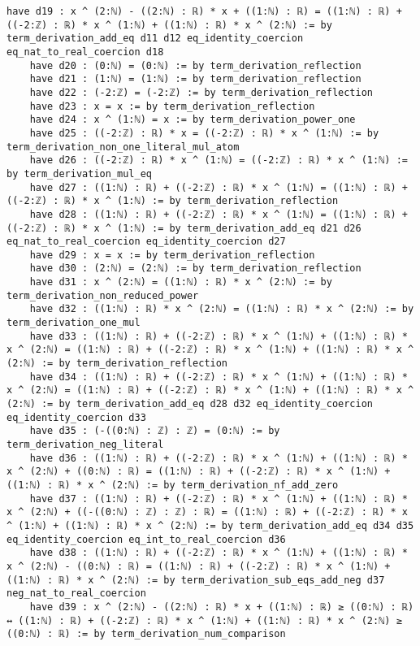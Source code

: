 \documentclass{article}
\begin{document}
\begin{tcolorbox}[colback=white!10, width=\linewidth]
\begin{lstlisting}[language=Lean4]
    have d19 : x ^ (2:ℕ) - ((2:ℕ) : ℝ) * x + ((1:ℕ) : ℝ) = ((1:ℕ) : ℝ) + ((-2:ℤ) : ℝ) * x ^ (1:ℕ) + ((1:ℕ) : ℝ) * x ^ (2:ℕ) := by term_derivation_add_eq d11 d12 eq_identity_coercion eq_nat_to_real_coercion d18
    have d20 : (0:ℕ) = (0:ℕ) := by term_derivation_reflection
    have d21 : (1:ℕ) = (1:ℕ) := by term_derivation_reflection
    have d22 : (-2:ℤ) = (-2:ℤ) := by term_derivation_reflection
    have d23 : x = x := by term_derivation_reflection
    have d24 : x ^ (1:ℕ) = x := by term_derivation_power_one
    have d25 : ((-2:ℤ) : ℝ) * x = ((-2:ℤ) : ℝ) * x ^ (1:ℕ) := by term_derivation_non_one_literal_mul_atom
    have d26 : ((-2:ℤ) : ℝ) * x ^ (1:ℕ) = ((-2:ℤ) : ℝ) * x ^ (1:ℕ) := by term_derivation_mul_eq
    have d27 : ((1:ℕ) : ℝ) + ((-2:ℤ) : ℝ) * x ^ (1:ℕ) = ((1:ℕ) : ℝ) + ((-2:ℤ) : ℝ) * x ^ (1:ℕ) := by term_derivation_reflection
    have d28 : ((1:ℕ) : ℝ) + ((-2:ℤ) : ℝ) * x ^ (1:ℕ) = ((1:ℕ) : ℝ) + ((-2:ℤ) : ℝ) * x ^ (1:ℕ) := by term_derivation_add_eq d21 d26 eq_nat_to_real_coercion eq_identity_coercion d27
    have d29 : x = x := by term_derivation_reflection
    have d30 : (2:ℕ) = (2:ℕ) := by term_derivation_reflection
    have d31 : x ^ (2:ℕ) = ((1:ℕ) : ℝ) * x ^ (2:ℕ) := by term_derivation_non_reduced_power
    have d32 : ((1:ℕ) : ℝ) * x ^ (2:ℕ) = ((1:ℕ) : ℝ) * x ^ (2:ℕ) := by term_derivation_one_mul
    have d33 : ((1:ℕ) : ℝ) + ((-2:ℤ) : ℝ) * x ^ (1:ℕ) + ((1:ℕ) : ℝ) * x ^ (2:ℕ) = ((1:ℕ) : ℝ) + ((-2:ℤ) : ℝ) * x ^ (1:ℕ) + ((1:ℕ) : ℝ) * x ^ (2:ℕ) := by term_derivation_reflection
    have d34 : ((1:ℕ) : ℝ) + ((-2:ℤ) : ℝ) * x ^ (1:ℕ) + ((1:ℕ) : ℝ) * x ^ (2:ℕ) = ((1:ℕ) : ℝ) + ((-2:ℤ) : ℝ) * x ^ (1:ℕ) + ((1:ℕ) : ℝ) * x ^ (2:ℕ) := by term_derivation_add_eq d28 d32 eq_identity_coercion eq_identity_coercion d33
    have d35 : (-((0:ℕ) : ℤ) : ℤ) = (0:ℕ) := by term_derivation_neg_literal
    have d36 : ((1:ℕ) : ℝ) + ((-2:ℤ) : ℝ) * x ^ (1:ℕ) + ((1:ℕ) : ℝ) * x ^ (2:ℕ) + ((0:ℕ) : ℝ) = ((1:ℕ) : ℝ) + ((-2:ℤ) : ℝ) * x ^ (1:ℕ) + ((1:ℕ) : ℝ) * x ^ (2:ℕ) := by term_derivation_nf_add_zero
    have d37 : ((1:ℕ) : ℝ) + ((-2:ℤ) : ℝ) * x ^ (1:ℕ) + ((1:ℕ) : ℝ) * x ^ (2:ℕ) + ((-((0:ℕ) : ℤ) : ℤ) : ℝ) = ((1:ℕ) : ℝ) + ((-2:ℤ) : ℝ) * x ^ (1:ℕ) + ((1:ℕ) : ℝ) * x ^ (2:ℕ) := by term_derivation_add_eq d34 d35 eq_identity_coercion eq_int_to_real_coercion d36
    have d38 : ((1:ℕ) : ℝ) + ((-2:ℤ) : ℝ) * x ^ (1:ℕ) + ((1:ℕ) : ℝ) * x ^ (2:ℕ) - ((0:ℕ) : ℝ) = ((1:ℕ) : ℝ) + ((-2:ℤ) : ℝ) * x ^ (1:ℕ) + ((1:ℕ) : ℝ) * x ^ (2:ℕ) := by term_derivation_sub_eqs_add_neg d37 neg_nat_to_real_coercion
    have d39 : x ^ (2:ℕ) - ((2:ℕ) : ℝ) * x + ((1:ℕ) : ℝ) ≥ ((0:ℕ) : ℝ) ↔ ((1:ℕ) : ℝ) + ((-2:ℤ) : ℝ) * x ^ (1:ℕ) + ((1:ℕ) : ℝ) * x ^ (2:ℕ) ≥ ((0:ℕ) : ℝ) := by term_derivation_num_comparison

\end{lstlisting}
\end{tcolorbox}
\end{document}
